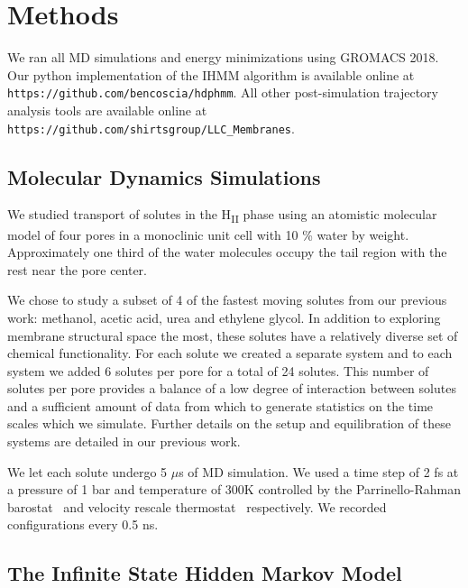 \documentclass[journal=jpcbfk,manuscript=article]{achemso}
\begin{document}
  \section{Methods}
    
  We ran all MD simulations and energy minimizations using GROMACS 2018.
  ~\cite{bekker_gromacs:_1993,berendsen_gromacs:_1995,van_der_spoel_gromacs:_2005,hess_gromacs_2008}  
  Our python implementation of the IHMM algorithm is available online at \\
  \texttt{https://github.com/bencoscia/hdphmm}. All other post-simulation 
  trajectory analysis tools are available online at
  \texttt{https://github.com/shirtsgroup/LLC\_Membranes}.

  \subsection{Molecular Dynamics Simulations}

  We studied transport of solutes in the H\textsubscript{II} phase using an
  atomistic molecular model of four pores in a monoclinic unit cell with 
  10 \% water by weight. Approximately one third of the water molecules 
  occupy the tail region with the rest near the pore center.
  
  We chose to study a subset of 4 of the fastest moving solutes from our previous
  work: methanol, acetic acid, urea and ethylene glycol.
  In addition to exploring membrane structural space the most, these solutes have a
  relatively diverse set of chemical functionality. For each solute we created a 
  separate system and to 
  each system we added 6 solutes per pore for a total of 24 solutes. This number 
  of solutes per pore provides a balance of a low degree of interaction between 
  solutes and a sufficient amount of data from which to generate statistics on the
  time scales which we simulate. Further details on the setup and equilibration of
  these systems are detailed in our previous work.\cite{coscia_chemically_2019}
  
  We let each solute undergo 5 $\mu$s of MD simulation. We used a time step of 2 fs
  at a pressure of 1 bar and temperature of 300K controlled by the Parrinello-Rahman 
  barostat~\cite{parrinello_polymorphic_1981} and velocity rescale 
  thermostat~\cite{bussi_canonical_2007} respectively. We recorded configurations every 0.5 ns.

  \subsection{The Infinite State Hidden Markov Model}\label{method:IHMM}
\end{document}
